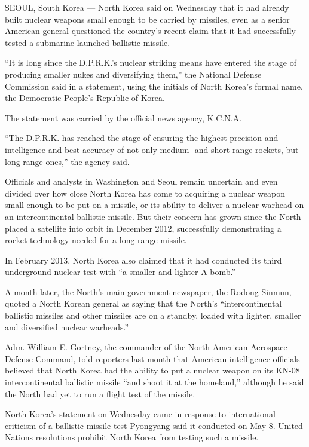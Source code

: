 SEOUL, South Korea --- North Korea said on Wednesday that it had already
built nuclear weapons small enough to be carried by missiles, even as a
senior American general questioned the country's recent claim that it
had successfully tested a submarine-launched ballistic missile.

``It is long since the D.P.R.K.'s nuclear striking means have entered
the stage of producing smaller nukes and diversifying them,'' the
National Defense Commission said in a statement, using the initials of
North Korea's formal name, the Democratic People's Republic of Korea.

The statement was carried by the official news agency, K.C.N.A.

``The D.P.R.K. has reached the stage of ensuring the highest precision
and intelligence and best accuracy of not only medium- and short-range
rockets, but long-range ones,'' the agency said.

Officials and analysts in Washington and Seoul remain uncertain and even
divided over how close North Korea has come to acquiring a nuclear
weapon small enough to be put on a missile, or its ability to deliver a
nuclear warhead on an intercontinental ballistic missile. But their
concern has grown since the North placed a satellite into orbit in
December 2012, successfully demonstrating a rocket technology needed for
a long-range missile.

In February 2013, North Korea also claimed that it had conducted its
third underground nuclear test with ``a smaller and lighter A-bomb.''

A month later, the North's main government newspaper, the Rodong Sinmun,
quoted a North Korean general as saying that the North's
``intercontinental ballistic missiles and other missiles are on a
standby, loaded with lighter, smaller and diversified nuclear
warheads.''

Adm. William E. Gortney, the commander of the North American Aerospace
Defense Command, told reporters last month that American intelligence
officials believed that North Korea had the ability to put a nuclear
weapon on its KN-08 intercontinental ballistic missile ``and shoot it at
the homeland,'' although he said the North had yet to run a flight test
of the missile.

North Korea's statement on Wednesday came in response to international
criticism of
\href{http://www.nytimes3xbfgragh.onion/2015/05/09/world/asia/north-korea-says-it-test-fired-missile-from-submarine.html}{a
ballistic missile test} Pyongyang said it conducted on May 8. United
Nations resolutions prohibit North Korea from testing such a missile.

